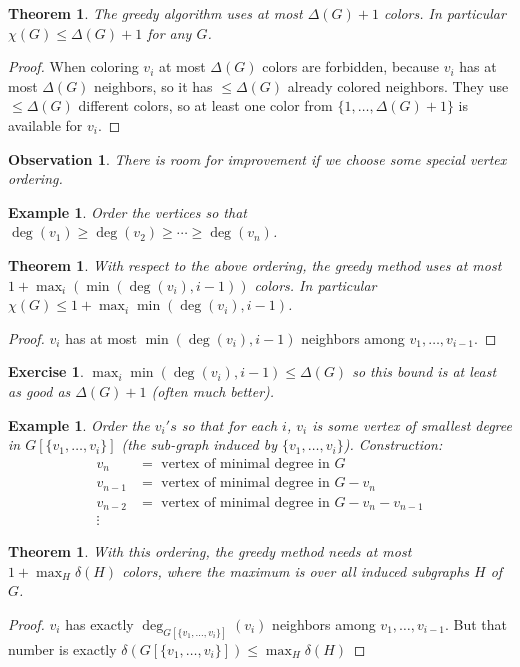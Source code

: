 \documentclass[a4paper]{article}
\theoremstyle{plain}
\newtheorem{theorem}[lemma]{Theorem}
\newtheorem{observation}[lemma]{Observation}
\theoremstyle{myremark}
\newtheorem{example}[lemma]{Example}
\newtheorem{exercise}[lemma]{Exercise}
\begin{document}
\begin{theorem}
The greedy algorithm uses at most $\Delta(G) + 1$ colors. In particular
$\chi(G) \le \Delta(G) + 1$ for any $G$.
\end{theorem}
\begin{proof}
When coloring $v_i$ at most $\Delta(G)$ colors are forbidden, because
$v_i$ has at most $\Delta(G)$ neighbors, so it has $\le \Delta(G)$
already colored neighbors. They use $\le \Delta(G)$ different colors, so
at least one color from $\{1,\ldots,\Delta(G) + 1\}$ is available for
$v_i$.
\end{proof}
\begin{observation}
There is room for improvement if we choose some special vertex ordering.
\end{observation}
\begin{example}
Order the vertices so that $\deg(v_1) \ge \deg(v_2) \ge \cdots \ge
\deg(v_n)$.
\end{example}
\begin{theorem}
With respect to the above ordering, the greedy method uses at most $1 +
\max_i(\min(\deg(v_i),i-1))$ colors. In particular $\chi(G) \le 1 +
\max_i\min(\deg(v_i),i-1)$.
\end{theorem}
\begin{proof}
$v_i$ has at most $\min(\deg(v_i),i-1)$ neighbors among $v_1,\ldots,v_{i-1}$.
\end{proof}
\begin{exercise}
$\max_i\min(\deg(v_i),i-1) \le \Delta(G)$ so this bound is at least as
good as $\Delta(G) + 1$ (often much better).
\end{exercise}
\begin{example}
Order the $v_i's$ so that for each $i$, $v_i$ is some vertex of smallest
degree in $G[\{v_1,\ldots,v_i\}]$ (the sub-graph induced by
$\{v_1,\ldots,v_i\}$).
Construction:
\begin{align*}
v_n &= \text{ vertex of minimal degree in } G \\
v_{n-1} &= \text{ vertex of minimal degree in } G-v_n \\
v_{n-2} &= \text{ vertex of minimal degree in } G-v_n-v_{n-1} \\
\vdots & 
\end{align*}
\end{example}

\begin{theorem}
With this ordering, the greedy method needs at most $1 + \max_H \delta(H)$ colors, 
where the maximum is over all induced subgraphs $H$ of $G$.
\end{theorem}
\begin{proof}
$v_i$ has exactly $\deg_{G[\{v_1,\ldots,v_i\}]}(v_i)$ neighbors among
$v_1,\ldots,v_{i-1}$. But that number is exactly
$\delta(G[\{v_1,\ldots,v_i\}]) \le \max_H \delta(H)$
\end{proof}
\end{document}
